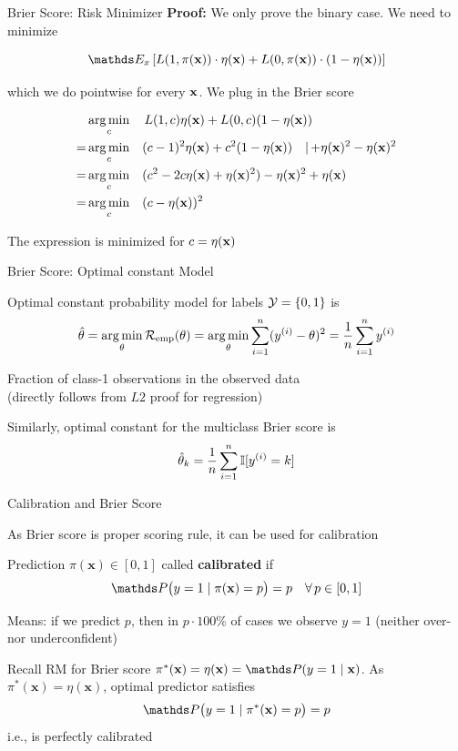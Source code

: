 \documentclass[11pt,compress,t,notes=noshow, xcolor=table]{beamer}
\begin{document}
\begin{frame}{Brier Score: Risk Minimizer}
\textbf{Proof: } We only prove the binary case. We need to minimize 

$$
\E_x \left[L(1, \pix) \cdot \eta(\xv) + L(0, \pix) \cdot (1 - \eta(\xv)) \right]
$$

which we do pointwise for every $\mathbf{x}$. We plug in the Brier score

\vspace*{-0.3cm}

\begin{align*}
& \operatorname*{arg\,min}_c \quad L(1, c) \eta(\mathbf{x}) + L(0, c) (1 - \eta(\mathbf{x})) \\ 
=&  \operatorname*{arg\,min}_c \quad (c - 1)^2 \eta(\mathbf{x}) + c^2 (1 - \eta(\mathbf{x}))  \quad |{\,+\eta(\mathbf{x})^2-\eta(\mathbf{x})^2}\\
=&  \operatorname*{arg\,min}_c \quad (c^2 -2c\eta(\mathbf{x}) + \eta(\mathbf{x})^2)- \eta(\mathbf{x})^2 + \eta(\mathbf{x}) \\
=&  \operatorname*{arg\,min}_c \quad (c - \eta(\mathbf{x}))^2
\end{align*}

The expression is minimized for $c = \eta(\mathbf{x})$

\end{frame}

\begin{framei}[sep=L]{Brier Score: Optimal constant Model}

\item Optimal constant probability model for labels $\mathcal{Y} = \{0, 1\}$ is 
$$\hat{\theta}=\operatorname*{arg\,min}_{\theta} \mathcal{R}_{\text{emp}}(\theta) = \operatorname*{arg\,min}_{\theta} \sum\limits_{i=1}^n (y^{(i)} - \theta)^2 = \frac{1}{n} \sum\limits_{i=1}^n y^{(i)}$$
\item Fraction of class-1 observations in the observed data\\ (directly follows from $L2$ proof for regression)
\item Similarly, optimal constant for the multiclass Brier score is $$\hat{\theta}_k = \frac{1}{n}\sum\limits_{i=1}^n \mathbb{I} [y^{(i)} = k]$$

\end{framei}

\begin{framei}[sep=L]{Calibration and Brier Score}

\item As Brier score is proper scoring rule, it can be used for calibration
\item Prediction $\pi(\mathbf{x})\in[0,1]$ called \textbf{calibrated} if 
$$\P\bigl(y=1 \mid \pi(\mathbf{x})=p\bigr)=p \quad \forall\, p\in[0,1]$$
\item Means: if we predict $p$, then in $p \cdot 100\%$ of cases we observe $y=1$ (neither over- nor underconfident)
\item Recall RM for Brier score $\pi^*(\mathbf{x}) = \eta(\mathbf{x}) = \P(y=1 \mid \mathbf{x})$. As \(\pi^*(\mathbf{x})=\eta(\mathbf{x})\), optimal predictor satisfies $$\P\bigl(y=1 \mid \pi^*(\mathbf{x})=p\bigr)=p$$
i.e., is perfectly calibrated

\end{framei}
\end{document}
